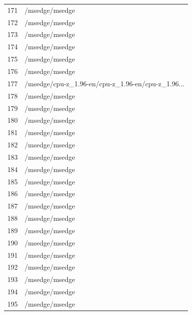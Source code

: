\documentclass[a4paper,twoside,12pt]{book}
\begin{document}
\begin{appendices}
\begin{table}
\begin{tabular}{ll}
		171 &                                     /msedge/msedge \\
		172 &                                     /msedge/msedge \\
		173 &                                     /msedge/msedge \\
		174 &                                     /msedge/msedge \\
		175 &                                     /msedge/msedge \\
		176 &                                     /msedge/msedge \\
		177 &  /msedge/cpu-z\_1.96-en/cpu-z\_1.96-en/cpu-z\_1.96... \\
		178 &                                     /msedge/msedge \\
		179 &                                     /msedge/msedge \\
		180 &                                     /msedge/msedge \\
		181 &                                     /msedge/msedge \\
		182 &                                     /msedge/msedge \\
		183 &                                     /msedge/msedge \\
		184 &                                     /msedge/msedge \\
		185 &                                     /msedge/msedge \\
		186 &                                     /msedge/msedge \\
		187 &                                     /msedge/msedge \\
		188 &                                     /msedge/msedge \\
		189 &                                     /msedge/msedge \\
		190 &                                     /msedge/msedge \\
		191 &                                     /msedge/msedge \\
		192 &                                     /msedge/msedge \\
		193 &                                     /msedge/msedge \\
		194 &                                     /msedge/msedge \\
		195 &                                     /msedge/msedge \\
		\bottomrule
	\end{tabular}

\end{table}
\end{appendices}
\end{document}
